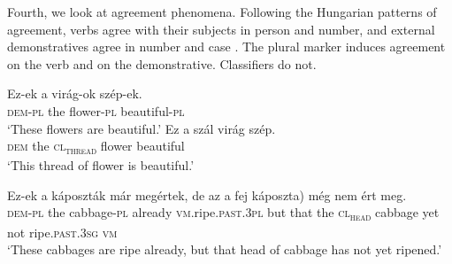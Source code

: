 \documentclass[output=paper]{langscibook}
\begin{document}
\ea \label{schv-nem:ex:26}
\label{schv-nem:ex:26a}
 \label{schv-nem:ex:26b}
\z
\z

\ea \label{schv-nem:ex:27}
  \label{schv-nem:ex:27b}
\z
\z

\noindent Fourth, we look at agreement phenomena. Following the Hungarian patterns of agreement, verbs agree with their subjects in person and number, and external demonstratives agree in number and case \citep{kenesei-etal-98}. The plural marker induces agreement on the verb and on the demonstrative. Classifiers do not. 

\ea \label{schv-nem:ex:28}
\ea \label{schv-nem:ex:28a}
\gll Ez-ek a virág-ok szép-ek. \\  
\textsc{dem}-\textsc{pl} the flower-\textsc{pl} beautiful-\textsc{pl}\\ 
\glt `These flowers are beautiful.'
\ex \label{schv-nem:ex:28b}
\gll Ez a szál virág szép. \\
\textsc{dem} the \textsc{cl\textsubscript{thread}} flower beautiful \\
\glt `This thread of flower is beautiful.'
\z
\z

\ea \label{schv-nem:ex:29}
\gll Ez-ek a káposzták már megértek, de az a fej\hspace{1.5cm} \minsp{(} káposzta) még nem ért meg. \\
\textsc{dem}-\textsc{pl} the cabbage-\textsc{pl} already \textsc{vm}.ripe.\textsc{past}.\textsc{3pl} but that  the \textsc{cl\textsubscript{head}} {} cabbage yet not ripe.\textsc{past}.\textsc{3sg} \textsc{vm}\\
\glt `These cabbages are ripe already, but that head of cabbage has not yet ripened.'
\z
\end{document}
